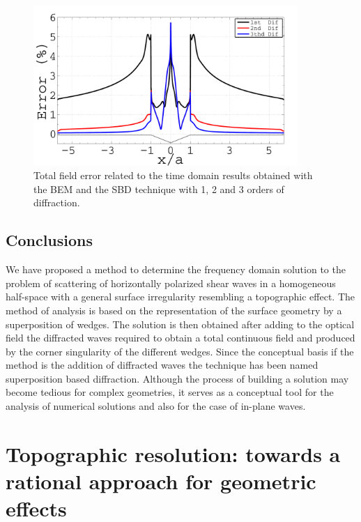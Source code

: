 \documentclass[11pt,letterpaper]{article}
\begin{document}
\begin{figure}[H]
	\centering
	\includegraphics[width=10cm]{IMAGES/Error_Time_Domain.pdf}
	\caption{Total field error related to the time domain results obtained with the BEM and the SBD technique with 1, 2 and 3 orders of diffraction. 
\label{fig:errortime}}
\end{figure}


\subsection*{Conclusions}
{}

We have proposed a method to determine the frequency domain solution to the problem of scattering of horizontally polarized shear waves in a homogeneous half-space with a general surface irregularity resembling a topographic effect. The method of analysis is based on the representation of the surface geometry by a superposition of wedges. The solution is then obtained after adding to the optical field the diffracted waves required to obtain a total continuous field and produced by the corner singularity of the different wedges. Since the conceptual basis if the method is the addition of diffracted waves the technique has been named superposition based diffraction. Although the process of building a solution may become tedious for complex geometries, it serves as a conceptual tool for the analysis of numerical solutions and also for the case of in-plane waves.



\newpage

\section{Topographic resolution: towards a rational approach for geometric effects}
{}
\end{document}
